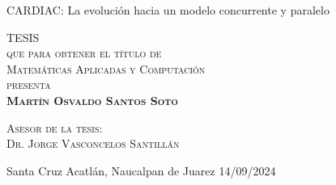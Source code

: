 \documentclass[
    fontsize=11pt,
    a4paper
   ]{scrbook}
\begin{document}
\begin{titlepage}
\begin{minipage}[c][0.81\textheight][t]{0.65\textwidth}
\begin{center}
                {\Huge CARDIAC: La evolución hacia un modelo concurrente y paralelo}\\[.3in]

                \vspace{2cm}            

                \textsc{\LARGE TESIS}\\[0.5cm]
                \textsc{\large que para obtener el título de}\\[0.5cm]
                \textsc{\large Matemáticas Aplicadas y Computación}\\[0.5cm]
                \textsc{\large presenta}\\[0.5cm]
                \textsc{\large \textbf{Martín Osvaldo Santos Soto}}\\[2cm]          

                \vspace{0.5cm}

                {\large\scshape Asesor de la tesis:\\[0.3cm] {Dr. Jorge Vasconcelos Santillán}}\\[.2in]

                \vspace{0.5cm}

                {Santa Cruz Acatlán, Naucalpan de Juarez}{ }{14/09/2024}
            \end{center}
        \end{minipage}
    \end{titlepage}
\end{document}
